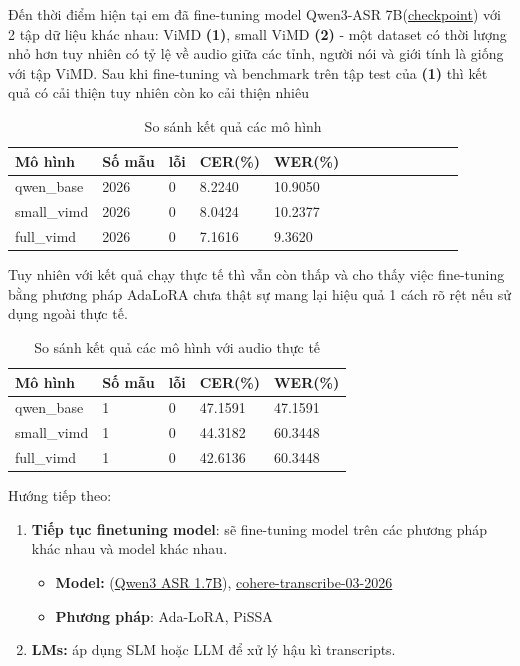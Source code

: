 Đến thời điểm hiện tại em đã fine-tuning model Qwen3-ASR 7B(\href{https://huggingface.co/Qwen/Qwen3-ASR-1.7B}{checkpoint}) với 2 tập dữ liệu khác nhau: ViMD \textbf{(1)}, small ViMD \textbf{(2)} - một dataset có thời lượng nhỏ hơn tuy nhiên có tỷ lệ về audio giữa các tỉnh, người nói và giới tính là giống với tập ViMD. Sau khi fine-tuning và benchmark trên tập test của \textbf{(1)} thì kết quả có cải thiện tuy nhiên còn ko cải thiện nhiêu 

\begin{table}[htbp]
\centering
\caption{So sánh kết quả các mô hình}
\label{tab:model_comparison}
\begin{tabular}{l l l l l r r r r r r r r}
\hline
\textbf{Mô hình} & \textbf{Số mẫu} & \textbf{lỗi} & \textbf{CER(\%)} & \textbf{WER(\%)}\\
\hline
qwen\_base  & 2026 & 0 & 8.2240 & 10.9050  \\
small\_vimd & 2026 & 0 & 8.0424 & 10.2377  \\
full\_vimd  & 2026 & 0 & 7.1616 & 9.3620  \\
\hline
\end{tabular}
\end{table}

Tuy nhiên với kết quả chạy thực tế thì vẫn còn thấp và cho thấy việc fine-tuning bằng phương pháp AdaLoRA chưa thật sự mang lại hiệu quả 1 cách rõ rệt nếu sử dụng ngoài thực tế.

\begin{table}[htbp]
\centering
\caption{So sánh kết quả các mô hình với audio thực tế}
\label{tab:model_comparison}
\begin{tabular}{l l l l l}
\hline
\textbf{Mô hình} & \textbf{Số mẫu} & \textbf{lỗi} & \textbf{CER(\%)} & \textbf{WER(\%)}\\
\hline
qwen\_base  & 1 & 0 & 47.1591 &  47.1591 \\
small\_vimd & 1 & 0 & 44.3182 &  60.3448 \\
full\_vimd  & 1 & 0 & 42.6136 &	60.3448 \\
\hline
\end{tabular}
\end{table}

Hướng tiếp theo:
\begin{enumerate}
    \item \textbf{Tiếp tục finetuning model}: sẽ fine-tuning model trên các phương pháp khác nhau và model khác nhau.
    \begin{itemize}
        \item \textbf{Model: } (\href{https://huggingface.co/Qwen/Qwen3-ASR-1.7B}{Qwen3 ASR 1.7B}), \href{https://huggingface.co/CohereLabs/cohere-transcribe-03-2026}{cohere-transcribe-03-2026}
        \item \textbf{Phương pháp}: Ada-LoRA, PiSSA
    \end{itemize}
    \item \textbf{LMs: } áp dụng SLM hoặc LLM để xử lý hậu kì transcripts.
\end{enumerate}
